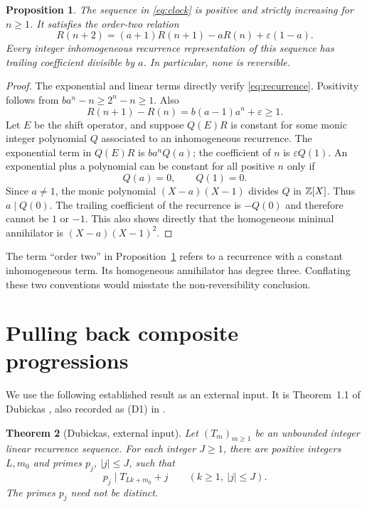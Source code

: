 \documentclass[11pt,a4paper]{article}
\newtheorem{theorem}{Theorem}[section]
\newtheorem{proposition}[theorem]{Proposition}
\theoremstyle{definition}\newtheorem{definition}[theorem]{Definition}
\theoremstyle{remark}\newtheorem{remark}[theorem]{Remark}
\begin{document}
\begin{proposition}\label{prop:nonrev}
The sequence in \eqref{eq:clock} is positive and strictly increasing
for $n\ge1$. It satisfies the order-two relation
\begin{equation}\label{eq:recurrence}
 R(n+2)=(a+1)R(n+1)-aR(n)+\varepsilon(1-a).
\end{equation}
Every integer inhomogeneous recurrence representation of this
sequence has trailing coefficient divisible by $a$. In particular,
none is reversible.
\end{proposition}
\begin{proof}
The exponential and linear terms directly verify
\eqref{eq:recurrence}. Positivity follows from
$ba^n-n\ge2^n-n\ge1$. Also
\[
 R(n+1)-R(n)=b(a-1)a^n+\varepsilon\ge1.
\]
Let $E$ be the shift operator, and suppose $Q(E)R$ is constant for
some monic integer polynomial $Q$ associated to an inhomogeneous
recurrence. The exponential term in $Q(E)R$ is $ba^nQ(a)$;
the coefficient of $n$ is $\varepsilon Q(1)$. An exponential plus
a polynomial can be constant for all positive $n$ only if
\[
 Q(a)=0,\qquad Q(1)=0.
\]
Since $a\ne1$, the monic polynomial $(X-a)(X-1)$ divides $Q$ in
$\mathbb Z[X]$. Thus $a\mid Q(0)$. The trailing coefficient of the
recurrence is $-Q(0)$ and therefore cannot be $1$ or $-1$.
This also shows directly that the homogeneous minimal annihilator is
$(X-a)(X-1)^2$.
\end{proof}

The term ``order two'' in Proposition~\ref{prop:nonrev} refers to a
recurrence with a constant inhomogeneous term. Its homogeneous
annihilator has degree three. Conflating these two conventions would
misstate the non-reversibility conclusion.

\section{Pulling back composite progressions}
We use the following established result as an external input. It is
Theorem~1.1 of Dubickas \cite{Dubickas}, also recorded as (D1) in
\cite{SaitoIntervals}.

\begin{theorem}[Dubickas, external input]\label{thm:Dub}
Let $(T_m)_{m\ge1}$ be an unbounded integer linear recurrence sequence.
For each integer $J\ge1$, there are positive integers $L,m_0$ and
primes $p_j$, $|j|\le J$, such that
\[
 p_j\mid T_{Lk+m_0}+j\qquad(k\ge1,\ |j|\le J).
\]
The primes $p_j$ need not be distinct.
\end{theorem}
\end{document}
